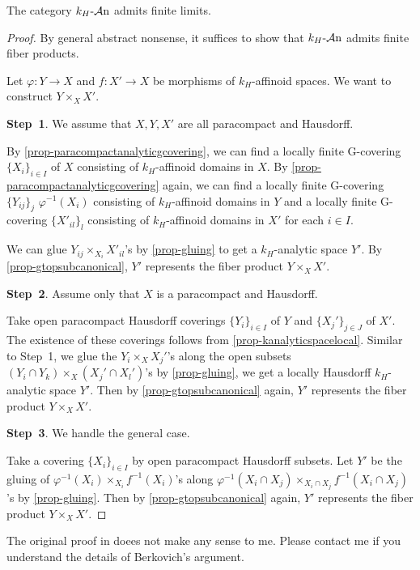 \begin{proposition}
    The category $k_H\text{-}\mathcal{A}\mathrm{n}$ admits finite limits.
\end{proposition}

\begin{proof}
    By general abstract nonsense, it suffices to show that $k_H\text{-}\mathcal{A}\mathrm{n}$ admits finite fiber products.

    Let $\varphi:Y\rightarrow X$ and $f:X'\rightarrow X$ be morphisms of $k_H$-affinoid spaces. We want to construct $Y\times_X X'$.

    \textbf{Step~1}. We assume that $X,Y,X'$ are all paracompact and Hausdorff.

    By \cref{prop-paracompactanalyticgcovering}, we can find a locally finite G-covering $\{X_i\}_{i\in I}$ of $X$ consisting of $k_H$-affinoid domains in $X$. By \cref{prop-paracompactanalyticgcovering} again, we can find a locally finite G-covering $\{Y_{ij}\}_j$ $\varphi^{-1}(X_i)$ consisting of $k_H$-affinoid domains in $Y$ and a locally finite G-covering $\{X'_{il}\}_l$ consisting of $k_H$-affinoid domains in $X'$ for each $i\in I$.

    We can glue $Y_{ij}\times_{X_i} X'_{il}$'s by \cref{prop-gluing} to get a $k_H$-analytic space $Y'$. By \cref{prop-gtopsubcanonical}, $Y'$ represents the fiber product $Y\times_X X'$.

    \textbf{Step~2}. Assume only that $X$ is a paracompact and Hausdorff.

    Take open paracompact Hausdorff coverings $\{Y_i\}_{i\in I}$ of $Y$ and $\{X_j'\}_{j\in J}$ of $X'$. The existence of these coverings follows from \cref{prop-kanalyticspacelocal}. Similar to Step~1, we glue the $Y_i\times_X X_j'$'s along the open subsets $(Y_i\cap Y_k)\times_X(X_j'\cap X_l')$'s  by \cref{prop-gluing}, we get a locally Hausdorff $k_H$-analytic space $Y'$. 
    Then by \cref{prop-gtopsubcanonical} again, $Y'$ represents the fiber product $Y\times_X X'$.

    \textbf{Step~3}. We handle the general case.

    Take a covering $\{X_i\}_{i\in I}$ by open paracompact Hausdorff subsets. Let $Y'$ be the gluing of $\varphi^{-1}(X_i)\times_{X_i}f^{-1}(X_i)$'s along $\varphi^{-1}(X_i\cap X_j)\times_{X_i\cap X_j}f^{-1}(X_i\cap X_j)$'s  by \cref{prop-gluing}. Then by \cref{prop-gtopsubcanonical} again, $Y'$ represents the fiber product $Y\times_X X'$.
\end{proof}
\begin{remark}
    The original proof in \cite{Berk93} doees not make any sense to me. Please contact me if you understand the details of Berkovich's argument.
\end{remark}

